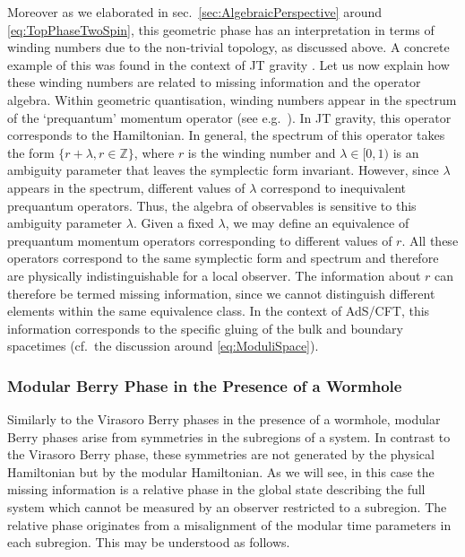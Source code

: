 \documentclass[a4paper,11pt]{article}
\newcommand{\1}{\mathds{1}}
\begin{document}
Moreover as we elaborated in sec.~\ref{sec:AlgebraicPerspective} around \eqref{eq:TopPhaseTwoSpin}, this geometric phase has an interpretation in terms of winding numbers due to the non-trivial topology, as discussed above. A concrete example of this was found in the context of JT gravity \cite{Nogueira:2021ngh}. Let us now explain how these winding numbers are related to missing information and the operator algebra. Within geometric quantisation, winding numbers appear in the spectrum of the `prequantum' momentum operator (see e.g.~\cite{carosso2018geometric}). In JT gravity, this operator corresponds to the Hamiltonian. In general, the spectrum of this operator takes the form $\{r+\lambda,r\in\mathds{Z}\}$, where $r$ is the winding number and $\lambda\in[0,1)$ is an ambiguity parameter that leaves the symplectic form invariant. However, since $\lambda$ appears in the spectrum, different values of $\lambda$ correspond to inequivalent prequantum operators. Thus, the algebra of observables is sensitive to this ambiguity parameter $\lambda$. Given a fixed $\lambda$, we may define an equivalence of prequantum momentum operators corresponding to different values of $r$. All these operators correspond to the same symplectic form and spectrum and therefore are physically indistinguishable for a local observer. The information about $r$ can therefore be termed  missing information, since we cannot distinguish different elements within the same equivalence class. In the context of AdS/CFT, this information corresponds to the specific gluing of the bulk and boundary spacetimes (cf.~the discussion around \eqref{eq:ModuliSpace}).

\subsubsection{Modular Berry Phase in the Presence of a Wormhole}
\label{sec:Modular Berry phases}

 Similarly to the Virasoro Berry phases in the presence of a wormhole, modular Berry phases arise from symmetries in the subregions of a system. In contrast to the Virasoro Berry phase, these symmetries are not generated by the physical Hamiltonian but by the modular Hamiltonian. As we will see, in this case the missing information is a relative phase in the global state describing the full system which cannot be measured by an observer restricted to a subregion. The relative phase originates from a misalignment of the modular time parameters in each subregion. This may be understood as follows.
\end{document}

